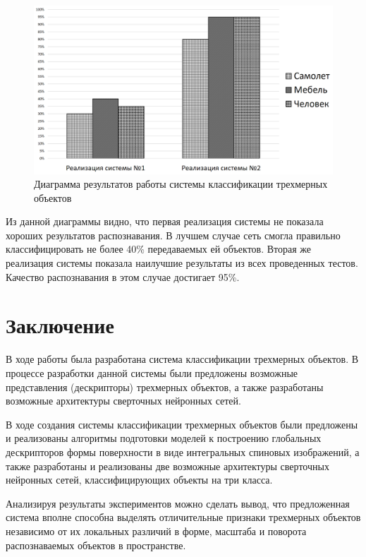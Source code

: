\documentclass[14pt]{article}
\numberwithin{figure}{section}
\numberwithin{equation}{section}
\begin{document}
\begin{figure}[h]
   \begin{center}
       \includegraphics[scale=0.42] {13.JPG}
       \caption{Диаграмма результатов работы системы классификации трехмерных объектов}
       \label{ris:13}
   \end{center}
\end{figure}

Из данной диаграммы видно, что первая реализация системы не показала хороших результатов распознавания. В лучшем случае сеть смогла правильно классифицировать не более 40\% передаваемых ей объектов. Вторая же реализация системы показала наилучшие результаты из всех проведенных тестов. Качество распознавания в этом случае достигает 95\%.

\newpage
{}
\section*{Заключение}

В ходе работы была разработана система классификации трехмерных объектов. В процессе разработки данной системы были предложены возможные представления (дескрипторы) трехмерных объектов, а также разработаны возможные архитектуры сверточных нейронных сетей.

В ходе создания системы классификации трехмерных объектов были предложены и реализованы алгоритмы подготовки моделей к построению глобальных дескрипторов формы поверхности в виде интегральных спиновых изображений, а также разработаны и реализованы две возможные архитектуры сверточных нейронных сетей, классифицирующих объекты на три класса.

Анализируя результаты экспериментов можно сделать вывод, что предложенная система вполне способна выделять отличительные признаки трехмерных объектов независимо от их локальных различий в форме, масштаба и поворота распознаваемых объектов в пространстве.
\end{document}
